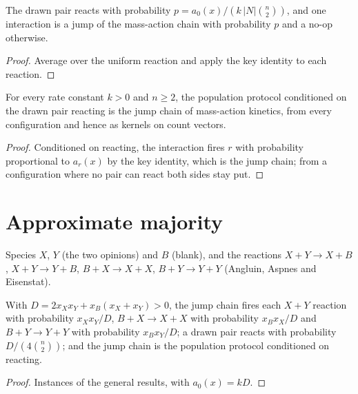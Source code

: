 \begin{theorem}\label{thm:step}
\leanok{}
The drawn pair reacts with probability $p = a_0(x) / (k\, |N| \binom{n}{2})$, and one interaction
is a jump of the mass-action chain with probability $p$ and a no-op otherwise.
\end{theorem}
\begin{proof}\leanok
Average over the uniform reaction and apply the key identity to each reaction.
\end{proof}

\begin{theorem}\label{thm:crn1}
\leanok{}
For every rate constant $k > 0$ and $n \ge 2$, the population protocol conditioned on the drawn
pair reacting is the jump chain of mass-action kinetics, from every configuration and hence as
kernels on count vectors.
\end{theorem}
\begin{proof}\leanok
Conditioned on reacting, the interaction fires $r$ with probability proportional to $a_r(x)$ by
the key identity, which is the jump chain; from a configuration where no pair can react both sides
stay put.
\end{proof}

\section{Approximate majority}
\begin{definition}\label{def:am}
\leanok{}
Species $X$, $Y$ (the two opinions) and $B$ (blank), and the reactions $X + Y \to X + B$,
$X + Y \to Y + B$, $B + X \to X + X$, $B + Y \to Y + Y$ (Angluin, Aspnes and Eisenstat).
\end{definition}

\begin{theorem}\label{thm:am}
\leanok{}
With $D = 2 x_X x_Y + x_B (x_X + x_Y) > 0$, the jump chain fires each $X + Y$ reaction with
probability $x_X x_Y / D$, $B + X \to X + X$ with probability $x_B x_X / D$ and $B + Y \to Y + Y$
with probability $x_B x_Y / D$; a drawn pair reacts with probability $D / (4 \binom{n}{2})$; and the
jump chain is the population protocol conditioned on reacting.
\end{theorem}
\begin{proof}\leanok
Instances of the general results, with $a_0(x) = k D$.
\end{proof}

